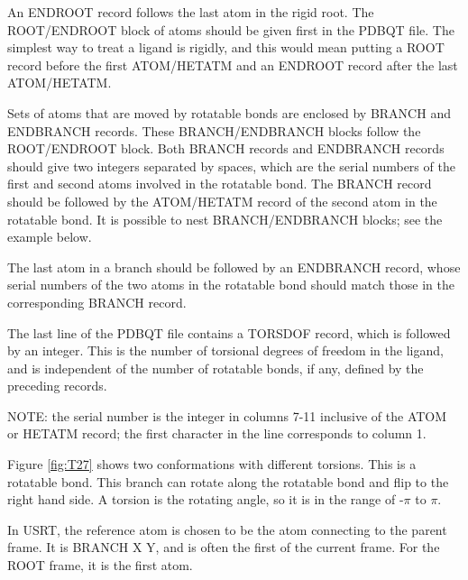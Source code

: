 \documentclass[twocolumn]{svjour3}          %
\begin{document}
An ENDROOT record follows the last atom in the rigid root. The ROOT/ENDROOT block of atoms should be given first in the PDBQT file. The simplest way to treat a ligand is rigidly, and this would mean putting a ROOT record before the first ATOM/HETATM and an ENDROOT record after the last ATOM/HETATM.

Sets of atoms that are moved by rotatable bonds are enclosed by BRANCH and ENDBRANCH records. These BRANCH/ENDBRANCH blocks follow the ROOT/ENDROOT block. Both BRANCH records and ENDBRANCH records should give two integers separated by spaces, which are the serial numbers of the first and second atoms involved in the rotatable bond. The BRANCH record should be followed by the ATOM/HETATM record of the second atom in the rotatable bond. It is possible to nest BRANCH/ENDBRANCH blocks; see the example below.

The last atom in a branch should be followed by an ENDBRANCH record, whose serial numbers of the two atoms in the rotatable bond should match those in the corresponding BRANCH record.

The last line of the PDBQT file contains a TORSDOF record, which is followed by an integer. This is the number of torsional degrees of freedom in the ligand, and is independent of the number of rotatable bonds, if any, defined by the preceding records.

NOTE: the serial number is the integer in columns 7-11 inclusive of the ATOM or HETATM record; the first character in the line corresponds to column 1.

Figure \ref{fig:T27} shows two conformations with different torsions. This is a rotatable bond. This branch can rotate along the rotatable bond and flip to the right hand side. A torsion is the rotating angle, so it is in the range of -$\pi$ to $\pi$. 

In USRT, the reference atom is chosen to be the atom connecting to the parent frame. It is BRANCH X Y, and is often the first of the current frame. For the ROOT frame, it is the first atom.
\end{document}
